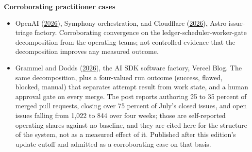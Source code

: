 \textbf{Corroborating practitioner cases}

\begin{itemize}
\tightlist
\item
  OpenAI (\href{https://openai.com/index/open-source-codex-orchestration-symphony/}{2026}), Symphony orchestration, and Cloudflare (\href{https://blog.cloudflare.com/astro-issue-triage/}{2026}), Astro issue-triage factory. Corroborating convergence on the ledger-scheduler-worker-gate decomposition from the operating teams; not controlled evidence that the decomposition improves any measured outcome.
\item
  Grammel and Dodds (\href{https://vercel.com/blog/building-a-software-factory-for-ai-sdk}{2026}), the AI SDK software factory, Vercel Blog. The same decomposition, plus a four-valued run outcome (success, flawed, blocked, manual) that separates attempt result from work state, and a human approval gate on every merge. The post reports authoring 25 to 35 percent of merged pull requests, closing over 75 percent of July's closed issues, and open issues falling from 1,022 to 844 over four weeks; those are self-reported operating shares against no baseline, and they are cited here for the structure of the system, not as a measured effect of it. Published after this edition's update cutoff and admitted as a corroborating case on that basis.
\end{itemize}
